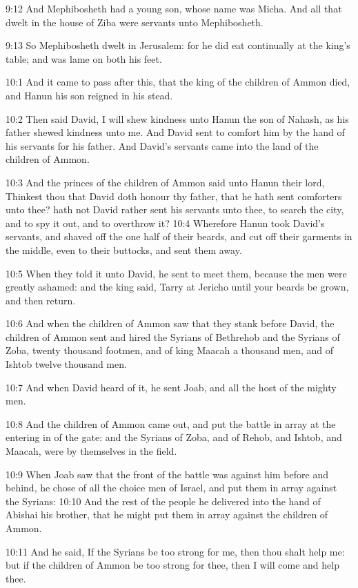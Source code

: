 9:12 And Mephibosheth had a young son, whose name was Micha. And all that dwelt in the house of Ziba were servants unto Mephibosheth.

9:13 So Mephibosheth dwelt in Jerusalem: for he did eat continually at the king's table; and was lame on both his feet.

10:1 And it came to pass after this, that the king of the children of Ammon died, and Hanun his son reigned in his stead.

10:2 Then said David, I will shew kindness unto Hanun the son of Nahash, as his father shewed kindness unto me. And David sent to comfort him by the hand of his servants for his father. And David's servants came into the land of the children of Ammon.

10:3 And the princes of the children of Ammon said unto Hanun their lord, Thinkest thou that David doth honour thy father, that he hath sent comforters unto thee? hath not David rather sent his servants unto thee, to search the city, and to spy it out, and to overthrow it?  10:4 Wherefore Hanun took David's servants, and shaved off the one half of their beards, and cut off their garments in the middle, even to their buttocks, and sent them away.

10:5 When they told it unto David, he sent to meet them, because the men were greatly ashamed: and the king said, Tarry at Jericho until your beards be grown, and then return.

10:6 And when the children of Ammon saw that they stank before David, the children of Ammon sent and hired the Syrians of Bethrehob and the Syrians of Zoba, twenty thousand footmen, and of king Maacah a thousand men, and of Ishtob twelve thousand men.

10:7 And when David heard of it, he sent Joab, and all the host of the mighty men.

10:8 And the children of Ammon came out, and put the battle in array at the entering in of the gate: and the Syrians of Zoba, and of Rehob, and Ishtob, and Maacah, were by themselves in the field.

10:9 When Joab saw that the front of the battle was against him before and behind, he chose of all the choice men of Israel, and put them in array against the Syrians: 10:10 And the rest of the people he delivered into the hand of Abishai his brother, that he might put them in array against the children of Ammon.

10:11 And he said, If the Syrians be too strong for me, then thou shalt help me: but if the children of Ammon be too strong for thee, then I will come and help thee.

